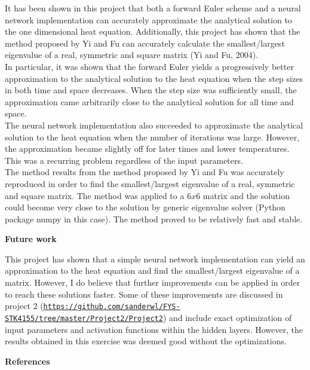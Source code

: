 \documentclass[12pt,a4paper]{article}
\begin{document}
\noindent It has been shown in this project that both a forward Euler scheme and a neural network implementation can accurately approximate the analytical solution to the one dimensional heat equation. Additionally, this project has shown that the method proposed by Yi and Fu can accurately calculate the smallest/largest eigenvalue of a real, symmetric and square matrix (Yi and Fu, 2004).
\\
In particular, it was shown that the forward Euler yields a progressively better approximation to the analytical solution to the heat equation when the step sizes in both time and space decreases. When the step size was sufficiently small, the approximation came arbitrarily close to the analytical solution for all time and space.
\\
The neural network implementation also succeeded to approximate the analytical solution to the heat equation when the number of iterations was large. However, the approximation became slightly off for later times and lower temperatures. This was a recurring problem regardless of the input parameters.
\\
The method results from the method proposed by Yi and Fu was accurately reproduced in order to find the smallest/largest eigenvalue of a real, symmetric and square matrix. The method was applied to a $6x6$ matrix and the solution could become very close to the solution by generic eigenvalue solver (Python package numpy in this case). The method proved to be relatively fast and stable.

\newpage

\begin{center}
\Large{\textbf{Future work}}
\end{center}

\noindent This project has shown that a simple neural network implementation can yield an approximation to the heat equation and find the smallest/largest eigenvalue of a matrix. However, I do believe that further improvements can be applied in order to reach these solutions faster. Some of these improvements are discussed in project 2 (\href{{https://github.com/sanderwl/FYS-STK4155/tree/master/Project2/Project2}}{\nolinkurl{https://github.com/sanderwl/FYS-STK4155/tree/master/Project2/Project2}}) and include exact optimization of input parameters and activation functions within the hidden layers. However, the results obtained in this exercise was deemed good without the optimizations.

\newpage

\begin{center}
\Large{\textbf{References}}
\end{center}
\end{document}
